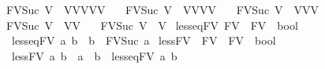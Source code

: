 \begin{isabellebody}
\ \ {\isachardoublequoteopen}FV{\isacharunderscore}{\kern0pt}Suc\ V{}\ {\isacharequal}{\kern0pt}\ {\isacharbraceleft}{\kern0pt}V{}{\isacharcomma}{\kern0pt}V{}{\isacharcomma}{\kern0pt}V{}{\isacharcomma}{\kern0pt}V{}{\isacharcomma}{\kern0pt}V{}{}{\isacharbraceright}{\kern0pt}{\isachardoublequoteclose}\ {\isacharbar}{\kern0pt}\isanewline
\ \ {\isachardoublequoteopen}FV{\isacharunderscore}{\kern0pt}Suc\ V{}\ {\isacharequal}{\kern0pt}\ {\isacharbraceleft}{\kern0pt}V{}{\isacharcomma}{\kern0pt}V{}{\isacharcomma}{\kern0pt}V{}{\isacharcomma}{\kern0pt}V{}{}{\isacharbraceright}{\kern0pt}{\isachardoublequoteclose}\ {\isacharbar}{\kern0pt}\isanewline
\ \ {\isachardoublequoteopen}FV{\isacharunderscore}{\kern0pt}Suc\ V{}\ {\isacharequal}{\kern0pt}\ {\isacharbraceleft}{\kern0pt}V{}{\isacharcomma}{\kern0pt}V{}{\isacharcomma}{\kern0pt}V{}{}{\isacharbraceright}{\kern0pt}{\isachardoublequoteclose}\ {\isacharbar}{\kern0pt}\isanewline
\ \ {\isachardoublequoteopen}FV{\isacharunderscore}{\kern0pt}Suc\ V{}\ {\isacharequal}{\kern0pt}\ {\isacharbraceleft}{\kern0pt}V{}{\isacharcomma}{\kern0pt}V{}{}{\isacharbraceright}{\kern0pt}{\isachardoublequoteclose}\ {\isacharbar}{\kern0pt}\isanewline
\ \ {\isachardoublequoteopen}FV{\isacharunderscore}{\kern0pt}Suc\ V{}{}\ {\isacharequal}{\kern0pt}\ {\isacharbraceleft}{\kern0pt}V{}{}{\isacharbraceright}{\kern0pt}{\isachardoublequoteclose}\isanewline
{}\isamarkupfalse%
\ less{\isacharunderscore}{\kern0pt}eq{\isacharunderscore}{\kern0pt}FV{\isacharcolon}{\kern0pt}{\isacharcolon}{\kern0pt}\ {\isachardoublequoteopen}FV\ {\isasymRightarrow}\ FV\ {\isasymRightarrow}\ bool{\isachardoublequoteclose}\ \isanewline
\ \ \ {\isachardoublequoteopen}less{\isacharunderscore}{\kern0pt}eq{\isacharunderscore}{\kern0pt}FV\ a\ b\ {\isacharequal}{\kern0pt}\ {\isacharparenleft}{\kern0pt}b\ {\isasymin}\ FV{\isacharunderscore}{\kern0pt}Suc\ a{\isacharparenright}{\kern0pt}{\isachardoublequoteclose}\isanewline
\isanewline
{}\isamarkupfalse%
\ less{\isacharunderscore}{\kern0pt}FV\ {\isacharcolon}{\kern0pt}{\isacharcolon}{\kern0pt}\ {\isachardoublequoteopen}FV\ {\isasymRightarrow}\ FV\ {\isasymRightarrow}\ bool{\isachardoublequoteclose}\isanewline
\ \ \ {\isachardoublequoteopen}less{\isacharunderscore}{\kern0pt}FV\ a\ b\ {\isacharequal}{\kern0pt}\ {\isacharparenleft}{\kern0pt}a\ {\isasymnoteq}\ b\ {\isasymand}\ less{\isacharunderscore}{\kern0pt}eq{\isacharunderscore}{\kern0pt}FV\ a\ b{\isacharparenright}{\kern0pt}{\isachardoublequoteclose}\isanewline

\end{isabellebody}
